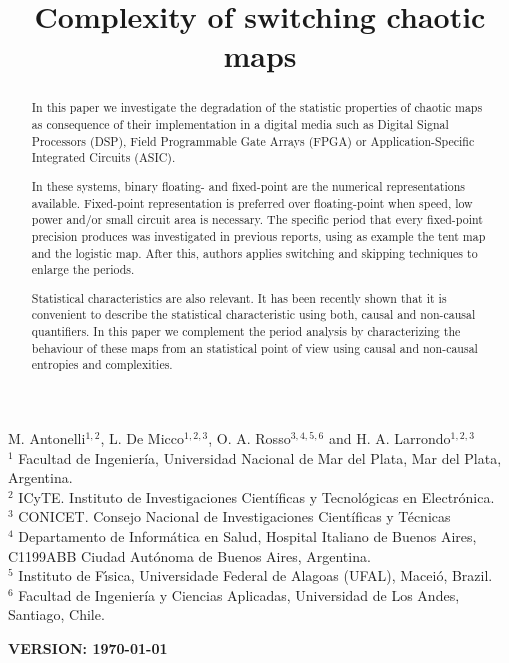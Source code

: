 \begin{frontmatter}

	\title{Complexity of switching chaotic maps}
	M. Antonelli$^{1,2}$, L. De Micco$^{1,2,3}$, O. A. Rosso$^{3,4,5,6}$ and H. A. Larrondo$^{1,2,3}$\\
	$^{1}$ Facultad de Ingenier\'ia, Universidad Nacional de Mar del Plata, Mar del Plata, Argentina.\\
	$^{2}$ ICyTE. Instituto de Investigaciones Científicas y Tecnológicas en Electrónica.\\
	$^{3}$ CONICET. Consejo Nacional de Investigaciones Científicas y Técnicas\\
	$^{4}$ Departamento de Inform\'atica en Salud, Hospital Italiano de Buenos Aires, C1199ABB Ciudad Autónoma de Buenos Aires, Argentina.\\
	$^{5}$ Instituto de F\'{\i}sica, Universidade Federal de Alagoas (UFAL), Macei\'o, Brazil.\\
	$^{6}$ Facultad de Ingeniería y Ciencias Aplicadas, Universidad de Los Andes, Santiago, Chile.
	

\begin{abstract}

In this paper we investigate the degradation of the statistic properties of chaotic maps as consequence of their implementation in a digital media such as Digital Signal Processors (DSP), Field Programmable Gate Arrays (FPGA) or Application-Specific Integrated Circuits (ASIC).

In these systems, binary floating- and fixed-point are the numerical representations available.
Fixed-point representation is preferred over floating-point when speed, low power and/or small circuit area is necessary.
The specific period that every fixed-point precision produces was investigated in previous reports, using as example the tent map and the logistic map.
After this, authors applies switching and skipping techniques to enlarge the periods.

Statistical characteristics are also relevant.
It has been recently shown that it is convenient to describe the statistical characteristic using both, causal and non-causal quantifiers.
In this paper we complement the period analysis by characterizing the behaviour of these maps from an statistical point of view using causal and non-causal entropies and complexities.

\end{abstract}
\maketitle
\end{frontmatter}
{\bf VERSION: \today}